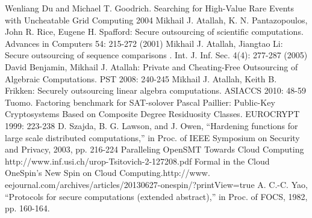\documentclass[runningheads,a4paper]{llncs}
\begin{document}
\begin{thebibliography}{4}
	Wenliang Du and Michael T. Goodrich. Searching for High-Value Rare Events with Uncheatable Grid Computing  2004
	Mikhail J. Atallah, K. N. Pantazopoulos, John R. Rice, Eugene H. Spafford: Secure outsourcing of scientific computations. Advances in Computers 54: 215-272 (2001)
	Mikhail J. Atallah, Jiangtao Li: Secure outsourcing of sequence comparisons . Int. J. Inf. Sec. 4(4): 277-287 (2005)
	David Benjamin, Mikhail J. Atallah: Private and Cheating-Free Outsourcing of Algebraic Computations. PST 2008: 240-245
	Mikhail J. Atallah, Keith B. Frikken: Securely outsourcing linear algebra computations. ASIACCS 2010: 48-59
	Tuomo. Factoring benchmark for SAT-solover
	Pascal Paillier: Public-Key Cryptosystems Based on Composite Degree Residuosity Classes. EUROCRYPT 1999: 223-238
	D. Szajda, B. G. Lawson, and J. Owen, “Hardening functions for large scale distributed computations,” in Proc. of IEEE Symposium on Security and Privacy, 2003, pp. 216-224
	Paralleling OpenSMT Towards Cloud Computing http://www.inf.usi.ch/urop-Tsitovich-2-127208.pdf‎
	Formal in the Cloud OneSpin’s New Spin on Cloud Computing.http://www. eejournal.com/archives/articles/20130627-onespin/?printView=true
  A. C.-C. Yao, “Protocols for secure computations (extended abstract),” in Proc. of FOCS, 1982, pp. 160-164.

\end{thebibliography}
\end{document}
